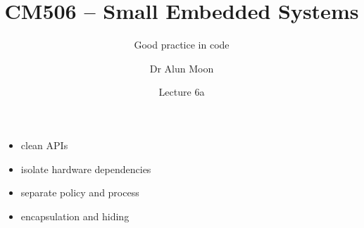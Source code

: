 \documentclass{beamer}
\title{CM506 -- Small Embedded Systems}
\subtitle{Good practice in code}
\author{Dr Alun Moon}
\institute[CS]{Department of Computer and Information Science }
\date{Lecture 6a}
\begin{document}
\frame\maketitle

\begin{frame}
  \begin{itemize}
  \item clean APIs
  \item isolate hardware dependencies
  \item separate policy and process
  \item encapsulation and hiding
  \end{itemize}
\end{frame}
\end{document}

